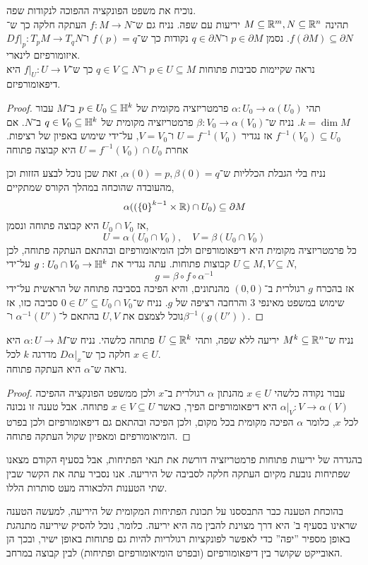 \question{}
\subquestion{}
נוכיח את משפט הפונקציה ההפוכה לנקודות שפה. \\
תהינה $M \subseteq \mathbb{R}^m, N \subseteq \mathbb{R}^n$ יריעות עם שפה.
נניח גם ש־$f : M \to N$ העתקה חלקה כך ש־$f(\partial M) \subseteq \partial N$.
נסמן $p \in \partial M$ ו־$q \in \partial N$ נקודות כך ש־$f(p) = q$ ו־$D f |_p : T_p M \to T_q N$ איזומורפיזם לינארי. \\
נראה שקיימות סביבות פתוחות $p \in U \subseteq M$ ו־$q \in V \subseteq N$ כך ש־$f |_U : U \to V$ היא דיפאומורפיזם.
\begin{proof}
	תהי $\alpha : U_0 \to \alpha(U_0)$ פרמטריזציה מקומית של $p \in U_0 \subseteq \mathbb{H}^k$ ב־$M$ עבור $k = \dim M$.
	נניח ש־$\beta : V_0 \to \alpha(V_0)$ פרמטריזציה מקומית של $q \in V_0 \subseteq \mathbb{H}^k$ ב־$N$.
	אם $f^{-1}(V_0) \subseteq U_0$ אז נגדיר $U = f^{-1}(V_0)$ ו־$V = V_0$, על־ידי שימוש באפיון של רציפות.
	אחרת $U = f^{-1}(V_0) \cap U_0$ היא קבוצה פתוחה 

	נניח בלי הגבלת הכלליות ש־$\alpha(0) = p, \beta(0) = q$, זאת שכן נוכל לבצע הזזות וכן מהעובדה שהוכחה במהלך הקורס שמתקיים,
	\[
		\alpha(({\{ 0 \}}^{k - 1} \times \mathbb{R}) \cap U_0) \subseteq \partial M
	\]
	אז $U_0 \cap V_0$ היא קבוצה פתוחה ונסמן,
	\[
		U = \alpha(U_0 \cap V_0),
		\quad
		V = \beta(U_0 \cap V_0)
	\]
	כל פרמטריזציה מקומית היא דיפאומורפיזם ולכן הומיאומורפיזם ובהתאם העתקה פתוחה, לכן $U \subseteq M, V \subseteq N$ קבוצות פתוחות.
	עתה נגדיר את $g : U_0 \cap V_0 \to \mathbb{H}^k$ על־ידי,
	\[
		g = \beta \circ f \circ \alpha^{-1}
	\]
	אז בהכרח $g$ רגולרית ב־$(0, 0)$ מהנתונים, והיא הפיכה בסביבה פתוחה של הראשית על־ידי שימוש במשפט מאינפי 3 והרחבה רציפה של $g$.
	נניח ש־$0 \in U' \subseteq U_0 \cap V_0$ סביבה כזו, אז נוכל לצמצם את $U, V$ בהתאם ל־$\alpha^{-1}(U')$ ו־$\beta^{-1}(g(U'))$.
\end{proof}

\subquestion{}
נניח ש־$M^k \subseteq \mathbb{R}^n$ יריעה ללא שפה,
ותהי $U \subseteq \mathbb{R}^k$ פתוחה כלשהי.
נניח ש־$\alpha : U \to M$ היא חלקה כך ש־$D \alpha |_x$ מדרגה $k$ לכל $x \in U$. \\
נראה ש־$\alpha$ היא העתקה פתוחה.
\begin{proof}
	עבור נקודה כלשהי $x \in U$ מהנתון $\alpha$ רגולרית ב־$x$ ולכן ממשפט הפונקציה ההפיכה $\alpha |_V : V \to \alpha(V)$ היא דיפאומורפיזם הפיך, כאשר $x \in V \subseteq U$ פתוחה.
	אבל טענה זו נכונה לכל $x$, כלומר $\alpha$ הפיכה מקומית בכל מקום, ולכן הפיכה ובהתאם גם דיפאומורפיזם ולכן בפרט הומיאומורפיזם ומאפיון שקול העתקה פתוחה.
\end{proof}

\subquestion{}
בהגדרה של יריעות פתוחות פרמטריזציה דורשת את תנאי הפתיחות, אבל בסעיף הקודם מצאנו שפתיחות נובעת מקיום העתקה חלקה לסביבה של היריעה.
אנו נסביר עתה את הקשר שבין שתי הטענות הלכאורה מעט סותרות הללו.
\begin{solution}
	בהוכחת הטענה כבר התבססנו על תכונת הפתיחות המקומית של היריעה, למעשה הטענה שראינו בסעיף ב' היא דרך מצוינת להבין מה היא יריעה.
	כלומר, נוכל להסיק שיריעה מתנהגת באופן מספיר ''יפה'' כדי לאפשר לפונקציות רגולריות להיות גם פתוחות באופן ישיר, ובכך הן האובייקט שקושר בין דיפאומורפיזם (ובפרט הומיאומורפיזם ופתיחות) לבין קבוצה במרחב.
\end{solution}

